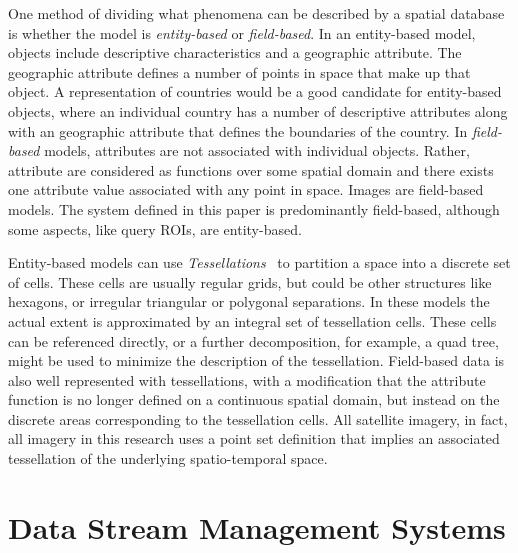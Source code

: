 \documentclass{ucdthesis}       %
\begin{document}
One method of dividing what phenomena can be described by a spatial
database is whether the model is \emph{entity-based} or
\emph{field-based}.  In an entity-based model, objects include
descriptive characteristics and a geographic attribute.  The
geographic attribute defines a number of points in space that make up
that object.  A representation of countries would be a good candidate
for entity-based objects, where an individual country has a number of
descriptive attributes along with an geographic attribute that defines
the boundaries of the country.  In \emph{field-based} models,
attributes are not associated with individual objects.  Rather,
attribute are considered as functions over some spatial domain and
there exists one attribute value associated with any point in space.
Images are field-based models.  The system defined in this paper is
predominantly field-based, although some aspects, like query
\acp{ROI}, are entity-based.

Entity-based models can use \emph{Tessellations}~\cite{wiki06} to
partition a space into a discrete set of cells.  These cells are
usually regular grids, but could be other structures like hexagons, or
irregular triangular or polygonal separations.  In these models the
actual extent is approximated by an integral set of tessellation
cells.  These cells can be referenced directly, or a further
decomposition, for example, a quad tree, might be used to minimize the
description of the tessellation.  Field-based data is also well
represented with tessellations, with a modification that the attribute
function is no longer defined on a continuous spatial domain, but
instead on the discrete areas corresponding to the tessellation cells.
All satellite imagery, in fact, all imagery in this research uses a
point set definition that implies an associated tessellation of the
underlying spatio-temporal space.


\section{Data Stream Management Systems}
\label{sec:dsms}
\end{document}
